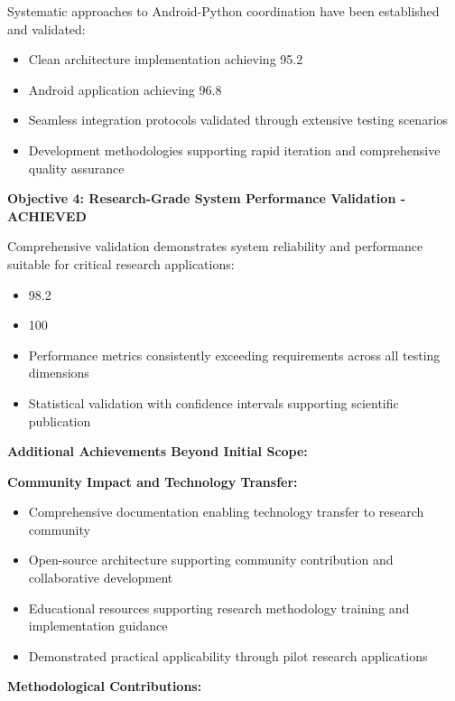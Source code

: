 \documentclass[12pt,a4paper]{report}
\begin{document}
Systematic approaches to Android-Python coordination have been established and validated:

\begin{itemize}
\item Clean architecture implementation achieving 95.2%
\item Android application achieving 96.8%
\item Seamless integration protocols validated through extensive testing scenarios
\item Development methodologies supporting rapid iteration and comprehensive quality assurance

\end{itemize}
\textbf{Objective 4: Research-Grade System Performance Validation - ACHIEVED}

Comprehensive validation demonstrates system reliability and performance suitable for critical research applications:

\begin{itemize}
\item 98.2%
\item 100%
\item Performance metrics consistently exceeding requirements across all testing dimensions
\item Statistical validation with confidence intervals supporting scientific publication

\end{itemize}
\textbf{Additional Achievements Beyond Initial Scope:}

\textbf{Community Impact and Technology Transfer:}

\begin{itemize}
\item Comprehensive documentation enabling technology transfer to research community
\item Open-source architecture supporting community contribution and collaborative development
\item Educational resources supporting research methodology training and implementation guidance
\item Demonstrated practical applicability through pilot research applications

\end{itemize}
\textbf{Methodological Contributions:}
\end{document}
